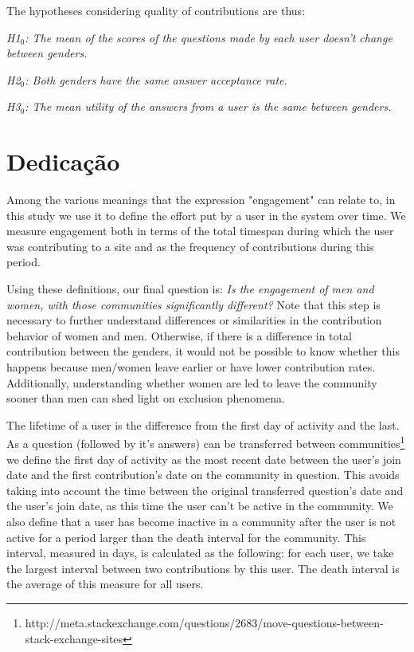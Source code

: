 The hypotheses considering quality of contributions are thus:

\textit{H1$_0$: The mean of the scores of the questions made by each user doesn't change between genders.}

\textit{H2$_0$: Both genders have the same answer acceptance rate.}

\textit{H3$_0$: The mean utility of the answers from a user is the same between genders.}


\section{Dedicação} %
\label{sub:dedica_o}

Among the various meanings that the expression "engagement" can relate to, in this study we use it to define the effort put by a user in the system over time. We measure engagement both in terms of the total timespan during which the user was contributing to a site and as the frequency of contributions during this period. 

Using these definitions, our final question is: \textit{Is the engagement of men and women, with those communities significantly different?} 
Note that this step is necessary to further understand differences or similarities in the contribution behavior of women and men. Otherwise, if there is a difference in total contribution between the genders, it would not be possible to know whether this happens because men/women leave earlier or have lower contribution rates. Additionally, understanding whether women are led to leave the community sooner than men can shed light on exclusion phenomena. 

The lifetime of a user is the difference from the first day of activity and the last. As a question (followed by it's answers) can be transferred between communities\footnote{http://meta.stackexchange.com/questions/2683/move-questions-between-stack-exchange-sites} we define the first day of activity as the most recent date between the user's join date and the first contribution's date on the community in question. This avoids taking into account the time between the original transferred question's date and the user's join date, as this time the user can't be active in the community. We also define that a user has become inactive in a community after the user is not active for a period larger than the death interval for the community. This interval, measured in days, is calculated as the following: for each user, we take the largest interval between two contributions by this user. The death interval is the average of this measure for all users.

